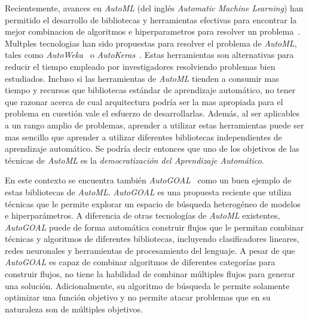 Recientemente, avances en \emph{AutoML} (del inglés \emph{Automatic Machine Learning}) han permitido el desarrollo de bibliotecas y herramientas efectivas para encontrar la mejor combinacion de algoritmos e hiperparametros para resolver un problema~.
Multples tecnologias han sido propuestas para resolver el problema de \emph{AutoML}, tales como \emph{AutoWeka}~\parencite{autoweka} o \emph{AutoKeras}~\parencite{autoKeras}.
Estas herramientas son alternativas para reducir el tiempo empleado por investigadores resolviendo problemas bien estudiados.
Incluso si las herramientas de \emph{AutoML} tienden a consumir mas tiempo y recursos que bibliotecas estándar de aprendizaje automático, no tener que razonar acerca de cual arquitectura podría ser la mas apropiada para el problema en cuestión vale el esfuerzo de desarrollarlas.
Además, al ser aplicables a un rango amplio de problemas, aprender a utilizar estas herramientas puede ser mas sencillo que aprender a utilizar diferentes bibliotecas independientes de aprendizaje automático.
Se podría decir entonces que uno de los objetivos de las técnicas de \emph{AutoML} es la \emph{democratización del Aprendizaje Automático}.


En este contexto se encuentra también \emph{AutoGOAL}~\parencite{autogoal} como un buen ejemplo de estas bibliotecas de \emph{AutoML}.
\emph{AutoGOAL} es una propuesta reciente que utiliza técnicas que le permite explorar un espacio de búsqueda heterogéneo de modelos e hiperparámetros.
A diferencia de otras tecnologías de \emph{AutoML} existentes, \emph{AutoGOAL} puede de forma automática construir flujos que le permitan combinar técnicas y algoritmos de diferentes bibliotecas, incluyendo clasificadores lineares, redes neuronales y herramientas de procesamiento del lenguaje.
A pesar de que \emph{AutoGOAL} es capaz de combinar algoritmos de diferentes categorías para construir flujos, no tiene la habilidad de combinar múltiples flujos para generar una solución.
Adicionalmente, su algoritmo de búsqueda le permite solamente optimizar una función objetivo y no permite atacar problemas que en su naturaleza son de múltiples objetivos.


